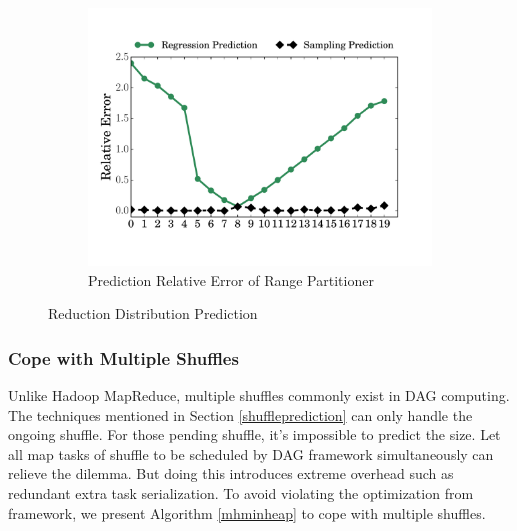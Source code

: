 \begin{figure}
\begin{subfigure}[b]{0.32\linewidth}
		\includegraphics[width=\linewidth]{fig/prediction_relative_error}
		\caption{Prediction Relative Error of Range Partitioner}
		\label{fig:prediction_relative_error}
	\end{subfigure}
	\caption{Reduction Distribution Prediction}
	\label{fig:dis}
\end{figure}
\subsubsection{Cope with Multiple Shuffles}
Unlike Hadoop MapReduce, multiple shuffles commonly exist in DAG computing. The techniques mentioned in Section \ref{shuffleprediction} can only handle the ongoing shuffle. For those pending shuffle, it's impossible to predict the size. Let all map tasks of shuffle to be scheduled by DAG framework simultaneously can relieve the dilemma. But doing this introduces extreme overhead such as redundant extra task serialization. To avoid violating the optimization from framework, we present Algorithm \ref{mhminheap} to cope with multiple shuffles.

